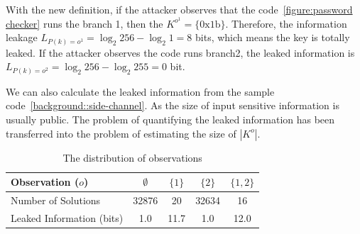 With the new definition, if the attacker observes that the code~\ref{figure:password checker} runs the branch 1, 
then the $K^{o^{1}} = \{\mathrm{0x1b}\}$. Therefore, the information leakage $L_{P(k)=o^{1}} = \log_2{256} - \log_2{1} = 8$
bits, which means the key is totally leaked. If the attacker observes the code runs branch2, the leaked information is 
$L_{P(k)=o^{2}} = \log_2{256} - \log_2{255} = 0$ bit.


We can also calculate the leaked information
from the sample code~\ref{background::side-channel}. As the size of input 
sensitive information is usually public. The problem of quantifying the
leaked information has been transferred into the problem of estimating
the size of $|K^o|$.

\begin{table}[ht]
    \centering


\begin{tabular}{l|cccc}
    \hline
Observation ($o$)  & $\emptyset$ & ${\{1\}}$ & ${\{2\}}$ & ${\{1, 2\}}$ \\ \hline
Number of Solutions &  32876 & 20 & 32634 & 16 \\ \hline
Leaked Information (bits)     & 1.0 & 11.7 & 1.0  & 12.0   \\
    \hline
\end{tabular}
\caption{The distribution of observations}
\label{shtable}
\end{table}

